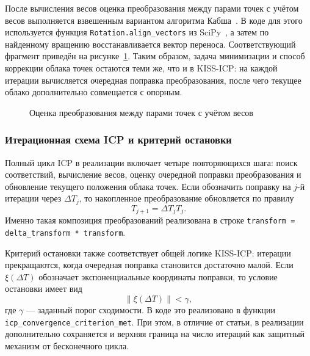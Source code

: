 После вычисления весов оценка преобразования между парами точек с учётом весов выполняется взвешенным вариантом алгоритма Кабша~\cite{kabsch-wikipedia,kabsch-nghiaho}. В коде для этого используется функция \texttt{Rotation.align\_vectors} из SciPy~\cite{scipy-align-vectors}, а затем по найденному вращению восстанавливается вектор переноса. Соответствующий фрагмент приведён на рисунке~\ref{lst:icp-kabsch}. Таким образом, задача минимизации и способ коррекции облака точек остаются теми же, что и в KISS-ICP: на каждой итерации вычисляется очередная поправка преобразования, после чего текущее облако дополнительно совмещается с опорным.

\begin{figure}
  \fontsize{12pt}{14pt}\selectfont
  
  \caption{Оценка преобразования между парами точек с учётом весов}
  \label{lst:icp-kabsch}
\end{figure}

\subsubsection{Итерационная схема ICP и критерий остановки}

Полный цикл ICP в реализации включает четыре повторяющихся шага: поиск соответствий, вычисление весов, оценку очередной поправки преобразования и обновление текущего положения облака точек. Если обозначить поправку на \(j\)-й итерации через \(\Delta T_j\), то накопленное преобразование обновляется по правилу
\begin{equation}
    T_{j+1} = \Delta T_j T_j.
\end{equation}
Именно такая композиция преобразований реализована в строке \texttt{transform = delta\_transform * transform}.

Критерий остановки также соответствует общей логике KISS-ICP: итерации прекращаются, когда очередная поправка становится достаточно малой. Если \(\xi(\Delta T)\) обозначает экспоненциальные координаты поправки, то условие остановки имеет вид
\begin{equation}
    \|\xi(\Delta T)\| < \gamma,
\end{equation}
где \(\gamma\) --- заданный порог сходимости. В коде это реализовано в функции \texttt{icp\_convergence\_criterion\_met}. При этом, в отличие от статьи, в реализации дополнительно сохраняется и верхняя граница на число итераций как защитный механизм от бесконечного цикла.

